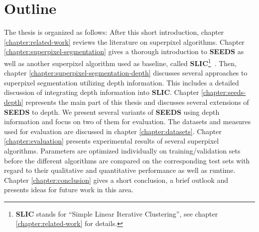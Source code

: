 \section{Outline}

The thesis is organized as follows: After this short introduction, chapter \ref{chapter:related-work} reviews the literature on superpixel algorithms. Chapter \ref{chapter:superpixel-segmentation} gives a thorough introduction to \textbf{SEEDS} as well as another superpixel algorithm used as baseline, called \textbf{SLIC}\footnote{\textbf{SLIC} stands for ``Simple Linear Iterative Clustering'', see chapter \ref{chapter:related-work} for details.}~\cite{AchantaShajiSmithLucchiFuaSuesstrunk:2010}. Then, chapter \ref{chapter:superpixel-segmentation-depth} discusses several approaches to superpixel segmentation utilizing depth information. This includes a detailed discussion of integrating depth information into \textbf{SLIC}. Chapter \ref{chapter:seeds-depth} represents the main part of this thesis and discusses several extensions of \textbf{SEEDS} to depth. We present several variants of \textbf{SEEDS} using depth information and focus on two of them for evaluation. The datasets and measures used for evaluation are discussed in chapter \ref{chapter:datasets}. Chapter \ref{chapter:evaluation} presents experimental results of several superpixel algorithms. Parameters are optimized individually on training/validation sets before the different algorithms are compared on the corresponding test sets with regard to their qualitative and quantitative performance as well as runtime. Chapter \ref{chapter:conclusion} gives a short conclusion, a brief outlook and presents ideas for future work in this area.


%
